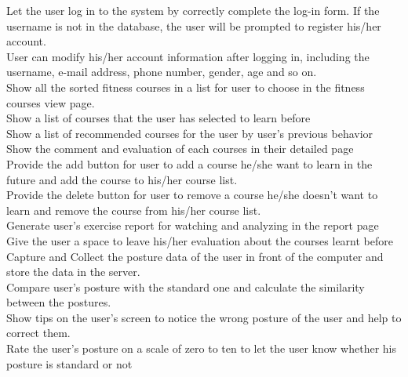 \documentclass[16pt]{scrreprt}
\begin{document}
 
Let the user log in to the system by correctly complete the log-in form. If the username is not in the database, the user will be prompted to register his/her account.\\

 
User can modify his/her account information after logging in, including the username, e-mail address, phone number, gender, age and so on.\\

 
Show all the sorted fitness courses in a list for user to choose in the fitness courses view page. \\

 
Show a list of courses that the user has selected to learn before\\

 
Show a list of recommended courses for the user by user's previous behavior \\

 
Show the comment and evaluation of each courses in their detailed page\\

 
Provide the add button for user to add a course he/she want to learn in the future and add the course to his/her course list.\\

 
Provide the delete button for user to remove a course he/she doesn't want to learn and remove the course from his/her course list.\\


Generate user's exercise report for watching and analyzing in the report page\\
 
Give the user a space to leave his/her evaluation about the courses learnt before\\

Capture and Collect the posture data of the user in front of the computer and store the data in the server.\\


Compare user's posture with the standard one and calculate the similarity between the postures.\\


Show tips on the user's screen to notice the wrong posture of the user and help to correct them.\\


Rate the user's posture on a scale of zero to ten to let the user know whether his posture is standard or not\\
\end{document}
